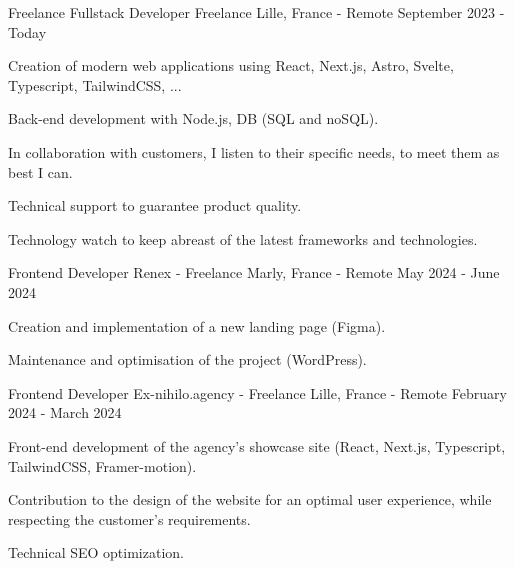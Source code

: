 
\begin{cventries}
  \cventry
    {Freelance Fullstack Developer} %
    {Freelance} %
    {Lille, France - Remote} %
    {September 2023 - Today} %
    {
      \begin{cvitems} %
        \item {Creation of modern web applications using React, Next.js, Astro, Svelte, Typescript, TailwindCSS, ...}
        \item {Back-end development with Node.js, DB (SQL and noSQL).}
        \item {In collaboration with customers, I listen to their specific needs, to meet them as best I can.}
        \item {Technical support to guarantee product quality.}
        \item {Technology watch to keep abreast of the latest frameworks and technologies.}
      \end{cvitems}
    }

  \cventry
    {Frontend Developer} %
    {Renex - Freelance} %
    {Marly, France - Remote} %
    {May 2024 - June 2024} %
    {
      \begin{cvitems} %
        \item {Creation and implementation of a new landing page (Figma).}
        \item {Maintenance and optimisation of the project (WordPress).}
      \end{cvitems}
    }  

  \cventry
    {Frontend Developer} %
    {Ex-nihilo.agency - Freelance} %
    {Lille, France - Remote} %
    {February 2024 - March 2024} %
    {
      \begin{cvitems} %
        \item {Front-end development of the agency's showcase site (React, Next.js, Typescript, TailwindCSS, Framer-motion).}
        \item {Contribution to the design of the website for an optimal user experience, while respecting the customer's requirements.}
        \item {Technical SEO optimization.}
      \end{cvitems}
    }


\end{cventries}
